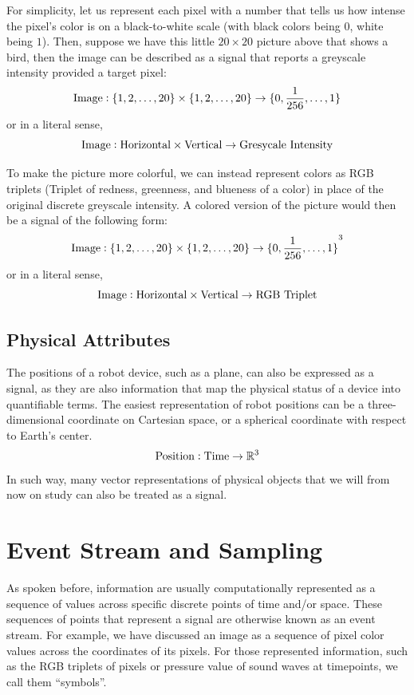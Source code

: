 For simplicity, let us represent each pixel with a number that tells us how intense the pixel's color is on a black-to-white scale (with black colors being $0$, white being $1$).
Then, suppose we have this little $20\times20$ picture above that shows a bird, then the image can be described as a signal that reports a greyscale intensity provided a target pixel:
\[
    {\rm Image}: \{1, 2, \dots, 20\} \times \{1, 2, \dots, 20\} \rightarrow \{0, \frac{1}{256}, \dots, 1\}
\]
or in a literal sense,
\[
    {\rm Image}: {\rm Horizontal} \times {\rm Vertical} \rightarrow {\rm Gresycale\ Intensity}
\]

To make the picture more colorful, we can instead represent colors as RGB triplets (Triplet of redness, greenness, and blueness of a color) in place of the original discrete greyscale intensity.
A colored version of the picture would then be a signal of the following form:
\[
    {\rm Image}: \{1, 2, \dots, 20\} \times \{1, 2, \dots, 20\} \rightarrow {\{0, \frac{1}{256}, \dots, 1\}}^3
\]
or in a literal sense,
\[
    {\rm Image}: {\rm Horizontal} \times {\rm Vertical} \rightarrow {\rm RGB\ Triplet}
\]

\subsection{Physical Attributes}
The positions of a robot device, such as a plane, can also be expressed as a signal, as they are also information that map the physical status of a device into quantifiable terms.
The easiest representation of robot positions can be a three-dimensional coordinate on Cartesian space, or a spherical coordinate with respect to Earth's center.
\[
    {\rm Position}: {\rm Time} \rightarrow \mathbb{R}^3
\]
In such way, many vector representations of physical objects that we will from now on study can also be treated as a signal.

\section{Event Stream and Sampling}
As spoken before, information are usually computationally represented as a sequence of values across specific discrete points of time and/or space.
These sequences of points that represent a signal are otherwise known as an event stream. For example, we have discussed an image as a sequence of pixel color values across the coordinates of its pixels.
For those represented information, such as the RGB triplets of pixels or pressure value of sound waves at timepoints, we call them ``symbols''.

